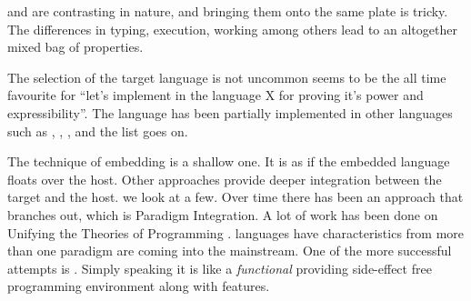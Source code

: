 \documentclass[thesis-solanki.tex]{subfiles}
\begin{document}
 and  are contrasting in nature, and
bringing them onto the same plate is tricky.
The differences in typing, execution, working among others lead to an altogether mixed bag of properties.


The selection of the target language is not uncommon\yyy{;}{:}
   seems 
to be the all time favourite for ``let's implement  in the language X for proving it's power and 
expressibility''. The  language has been partially implemented \cite{swipembedd} in other 
languages such as  \cite{racklog},   
\cite{komorowski1982qlog,robinson1982loglisp,robinson1980loglisp},  \cite{wikiprolog, jlog}, 
 \cite{jscriptlog} and the list \cite{yieldprolog} goes on.

The technique of embedding is a shallow one.
It is as if the embedded language floats over the host.
Other approaches provide deeper integration between the target and the host.
we look at a few.
Over time there has been an approach that branches out, which is Paradigm Integration.
A lot of work has been done on Unifying the Theories of Programming
\cite{DBLP:conf/utp/2006,DBLP:conf/utp/2008,DBLP:conf/utp/2010,DBLP:conf/utp/2012,hoare1998unifying,
  gibbons2013unifying}.
 languages  have characteristics from more than one paradigm are coming into the
mainstream.
One of the more successful attempts is . Simply speaking it is like a \textit{functional} 
 providing side-effect free programming environment along with 
 features.
\end{document}
